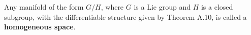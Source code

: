 Any manifold of the form $G/H$, where $G$ is a Lie group and $H$ is a closed subgroup, with the differentiable structure given by Theorem A.10, is called a \textbf{homogeneous space}.
